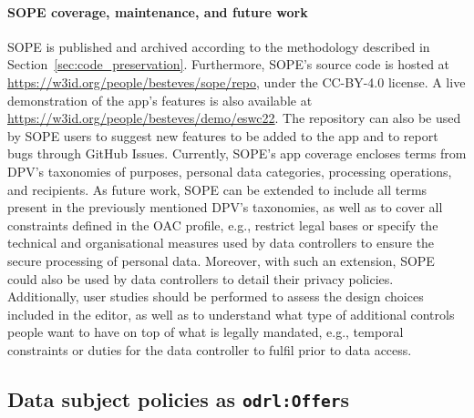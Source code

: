 \paragraph{SOPE coverage, maintenance, and future work}
SOPE is published and archived according to the methodology described in Section~\ref{sec:code_preservation}.
Furthermore, SOPE's source code is hosted at \url{https://w3id.org/people/besteves/sope/repo}, under the CC-BY-4.0 license.
A live demonstration of the app's features is also available at \url{https://w3id.org/people/besteves/demo/eswc22}.
The repository can also be used by SOPE users to suggest new features to be added to the app and to report bugs through GitHub Issues.
Currently, SOPE's app coverage encloses terms from DPV's taxonomies of purposes, personal data categories, processing operations, and recipients.
As future work, SOPE can be extended to include all terms present in the previously mentioned DPV's taxonomies, as well as to cover all constraints defined in the OAC profile, e.g., restrict legal bases or specify the technical and organisational measures used by data controllers to ensure the secure processing of personal data.
Moreover, with such an extension, SOPE could also be used by data controllers to detail their privacy policies.
Additionally, user studies should be performed to assess the design choices included in the editor, as well as to understand what type of additional controls people want to have on top of what is legally mandated, e.g., temporal constraints or duties for the data controller to fulfil prior to data access.

\subsection{Data subject policies as \texttt{odrl:Offer}s}
\label{sec:algorithm-offer}

